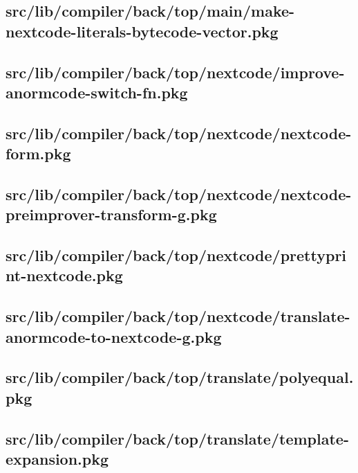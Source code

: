 \subsection{src/lib/compiler/back/top/main/make-nextcode-literals-bytecode-vector.pkg}


\subsection{src/lib/compiler/back/top/nextcode/improve-anormcode-switch-fn.pkg}


\subsection{src/lib/compiler/back/top/nextcode/nextcode-form.pkg}


\subsection{src/lib/compiler/back/top/nextcode/nextcode-preimprover-transform-g.pkg}


\subsection{src/lib/compiler/back/top/nextcode/prettyprint-nextcode.pkg}


\subsection{src/lib/compiler/back/top/nextcode/translate-anormcode-to-nextcode-g.pkg}


\subsection{src/lib/compiler/back/top/translate/polyequal.pkg}


\subsection{src/lib/compiler/back/top/translate/template-expansion.pkg}


